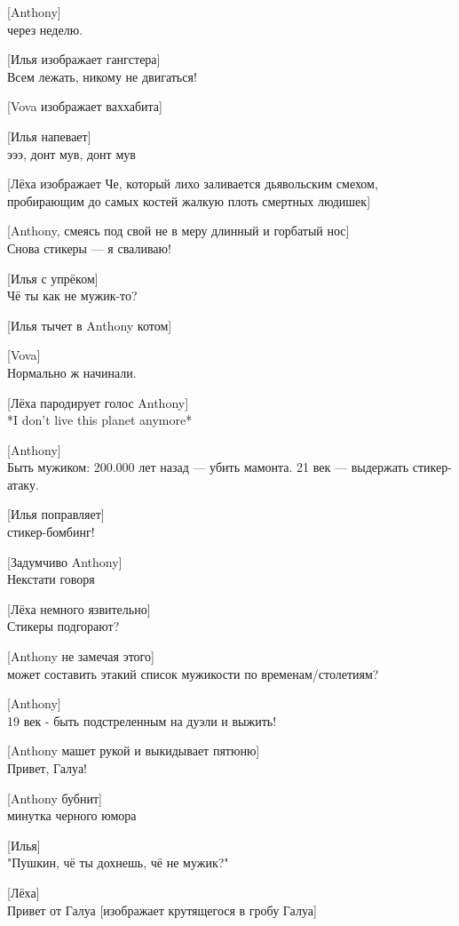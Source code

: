 [Anthony]\\
через неделю.


[Илья изображает гангстера]\\
Всем лежать, никому не двигаться!


[Vova изображает ваххабита]


[Илья напевает]\\
эээ, донт мув, донт мув


[Лёха изображает Че, который лихо заливается дьявольским смехом, пробирающим до самых костей жалкую плоть смертных людишек]


[Anthony, смеясь под свой не в меру длинный и горбатый нос]\\
Снова стикеры --- я сваливаю!


[Илья с упрёком]\\
Чё ты как не мужик-то?


[Илья тычет в Anthony котом]


[Vova]\\
Нормально ж начинали.


[Лёха пародирует голос Anthony]\\
*I don't live this planet anymore*


[Anthony]\\
Быть мужиком: 200.000 лет назад --- убить мамонта. 21 век --- выдержать стикер-атаку.


[Илья поправляет]\\
стикер-бомбинг!


[Задумчиво Anthony]\\
Некстати говоря


[Лёха немного язвительно]\\
Стикеры подгорают?


[Anthony не замечая этого]\\
может составить этакий список мужикости по временам/столетиям?


[Anthony]\\
19 век - быть подстреленным на дуэли и выжить!


[Anthony машет рукой и выкидывает пятюню]\\
Привет, Галуа!


[Anthony бубнит]\\
минутка черного юмора


[Илья]\\
"Пушкин, чё ты дохнешь, чё не мужик?"


[Лёха]\\
Привет от Галуа
[изображает крутящегося в гробу Галуа]


